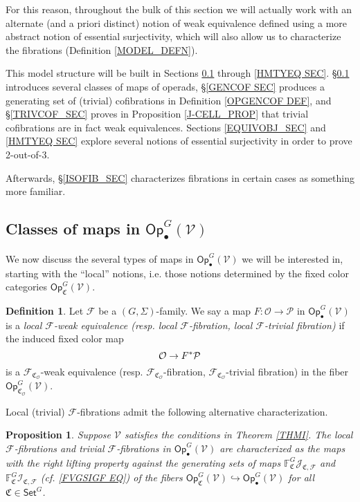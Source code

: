 \documentclass[a4paper,10pt
,draft
]{article}%
\numberwithin{equation}{section}
\numberwithin{figure}{section}
\newtheorem{proposition}[equation]{Proposition}%
\theoremstyle{definition} %
\newtheorem{definition}[equation]{Definition}%
\newcommand{\F}{\ensuremath{\mathcal F}}
\newcommand{\V}{\ensuremath{\mathcal V}}
\renewcommand{\O}{\ensuremath{\mathcal O}}
\renewcommand{\P}{\ensuremath{\mathcal P}}
\newcommand{\1}{\ensuremath{\mathbbm 1}}%
\begin{document}
For this reason, 
throughout the bulk of this section we will actually work with 
an alternate (and a priori distinct)
notion of weak equivalence
defined using a more abstract notion of essential surjectivity,
which will also allow us to characterize the fibrations (Definition \ref{MODEL_DEFN}).



This model structure will be built in Sections \ref{MAPSOPG_SEC} through \ref{HMTYEQ SEC}.
\S \ref{MAPSOPG_SEC} introduces several classes of maps of operads,
\S \ref{GENCOF SEC} produces a generating set of (trivial) cofibrations in Definition \ref{OPGENCOF DEF},
and \S \ref{TRIVCOF_SEC} proves in Proposition \ref{J-CELL_PROP} that trivial cofibrations are in fact weak equivalences.
Sections \ref{EQUIVOBJ_SEC} and \ref{HMTYEQ SEC} explore several notions of essential surjectivity in order to prove 2-out-of-3.

Afterwards, \S \ref{ISOFIB_SEC} characterizes fibrations in certain cases as something more familiar. 








\subsection{Classes of maps in $\mathsf{Op}^G_\bullet(\V)$}
\label{MAPSOPG_SEC}


We now discuss the several types of maps in 
$\mathsf{Op}^G_\bullet(\V)$ we will be interested in,
starting with the ``local'' notions, 
i.e. those notions determined by the fixed color categories $\mathsf{Op}_{\mathfrak{C}}^G(\V)$.



\begin{definition}
Let $\F$ be a $(G, \Sigma)$-family.
%
We say a map $F: \O \to \P$ in $\mathsf{Op}^G_\bullet(\V)$
is a \emph{local $\F$-weak equivalence (resp. local $\F$-fibration, local $\F$-trivial fibration)}
if the induced fixed color map
\[\O \to F^{\**} \P\]
is a $\F_{\mathfrak{C}_{\O}}$-weak equivalence (resp. $\F_{\mathfrak{C}_{\O}}$-fibration, $\F_{\mathfrak{C}_{\O}}$-trivial fibration) in the fiber $\mathsf{Op}^G_{\mathfrak{C}_{\O}}(\V)$.
\end{definition}


Local (trivial) $\F$-fibrations admit the following alternative characterization.



\begin{proposition}\label{LOCALTCHAR PROP}
Suppose $\V$ satisfies the conditions in Theorem \ref{THMI}.
The local $\F$-fibrations
and trivial $\F$-fibrations
in $\mathsf{Op}^G_\bullet(\V)$
are characterized as the maps with the right lifting property against the generating sets of maps 
$\mathbb{F}^G_{\mathfrak{C}}\mathcal{J}_{\mathfrak{C},\mathcal{F}}$ and $\mathbb{F}^G_{\mathfrak{C}}\mathcal{I}_{\mathfrak{C},\mathcal{F}}$
(cf. \eqref{FVGSIGF EQ})
of the fibers 
$\mathsf{Op}^G_{\mathfrak{C}}(\V) \hookrightarrow \mathsf{Op}^G_\bullet(\V)$
for all $\mathfrak{C} \in \mathsf{Set}^G$.
\end{proposition}
\end{document}
